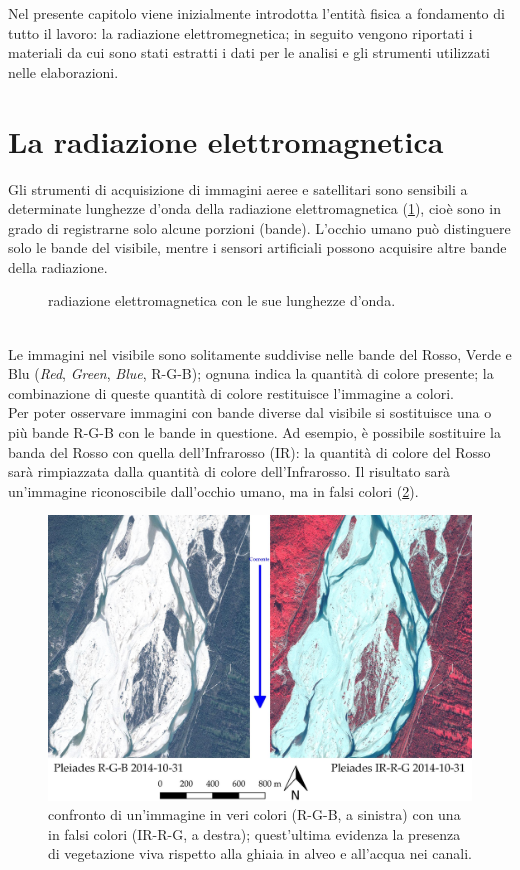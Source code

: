 Nel presente capitolo viene inizialmente introdotta l'entità fisica a fondamento di tutto il lavoro: la radiazione elettromegnetica;
in seguito vengono riportati i materiali da cui sono stati estratti i dati per le analisi e gli strumenti utilizzati nelle elaborazioni.


\section{La radiazione elettromagnetica}
Gli strumenti di acquisizione di immagini aeree e satellitari sono sensibili a determinate lunghezze d'onda della radiazione elettromagnetica (\cref{graph:el-mag-radiation}), cioè sono in grado di registrarne solo alcune porzioni (bande).
L'occhio umano può distinguere solo le bande del visibile, mentre i sensori artificiali possono acquisire altre bande della radiazione.
%
\begin{figure}
	\centering
	
	\caption[radiazione elettromagnetica]{radiazione elettromagnetica con le sue lunghezze d'onda.}
	\label{graph:el-mag-radiation}
\end{figure}
%
\\
Le immagini nel visibile sono solitamente suddivise nelle bande del Rosso, Verde e Blu (\emph{Red}, \emph{Green}, \emph{Blue}, R-G-B); ognuna indica la quantità di colore presente; la combinazione di queste quantità di colore restituisce l'immagine a colori.
\\
Per poter osservare immagini con bande diverse dal visibile si sostituisce una o più bande R-G-B con le bande in questione.
Ad esempio, è possibile sostituire la banda del Rosso con quella dell'Infrarosso (IR): la quantità di colore del Rosso sarà rimpiazzata dalla quantità di colore dell'Infrarosso.
Il risultato sarà un'immagine riconoscibile dall'occhio umano, ma in falsi colori (\cref{fig:confronto-bande-intro}).
%
\begin{figure}
	\centering
	\includegraphics[width=\textwidth]{files/confronto_bande_intro.jpeg}
	\caption[confronto immagini R-G-B e IR-R-G]{confronto di un'immagine in veri colori (R-G-B, a sinistra) con una in falsi colori (IR-R-G, a destra); quest'ultima evidenza la presenza di vegetazione viva rispetto alla ghiaia in alveo e all'acqua nei canali.}
	\label{fig:confronto-bande-intro}
\end{figure}
